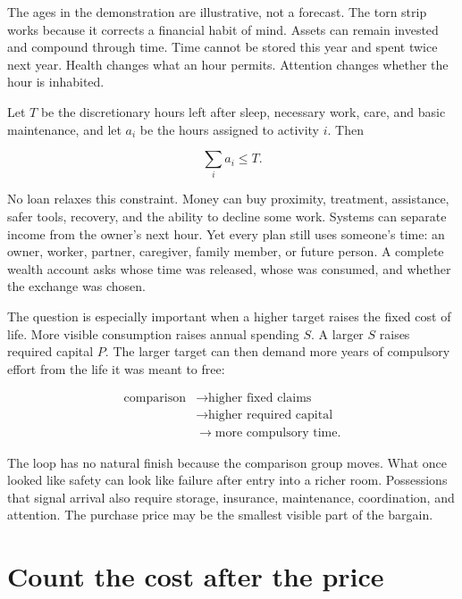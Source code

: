 The ages in the demonstration are illustrative, not a forecast. The torn strip
works because it corrects a financial habit of mind. Assets can remain invested
and compound through time. Time cannot be stored this year and spent twice
next year. Health changes what an hour permits. Attention changes whether the
hour is inhabited.

Let $T$ be the discretionary hours left after sleep, necessary work, care, and
basic maintenance, and let $a_i$ be the hours assigned to activity $i$. Then

\begin{equation}
\sum_i a_i\leq T.
\end{equation}

No loan relaxes this constraint. Money can buy proximity, treatment,
assistance, safer tools, recovery, and the ability to decline some work.
Systems can separate income from the owner's next hour. Yet every plan still
uses someone's time: an owner, worker, partner, caregiver, family member, or
future person. A complete wealth account asks whose time was released, whose
was consumed, and whether the exchange was chosen.

The question is especially important when a higher target raises the fixed
cost of life. More visible consumption raises annual spending $S$. A larger
$S$ raises required capital $P$. The larger target can then demand more years
of compulsory effort from the life it was meant to free:

\begin{equation}
\begin{aligned}
\text{comparison}
&\longrightarrow \text{higher fixed claims}\\
&\longrightarrow \text{higher required capital}\\
&\longrightarrow \text{more compulsory time}.
\end{aligned}
\end{equation}

The loop has no natural finish because the comparison group moves. What once
looked like safety can look like failure after entry into a richer room.
Possessions that signal arrival also require storage, insurance, maintenance,
coordination, and attention. The purchase price may be the smallest visible
part of the bargain.

\section{Count the cost after the price}

